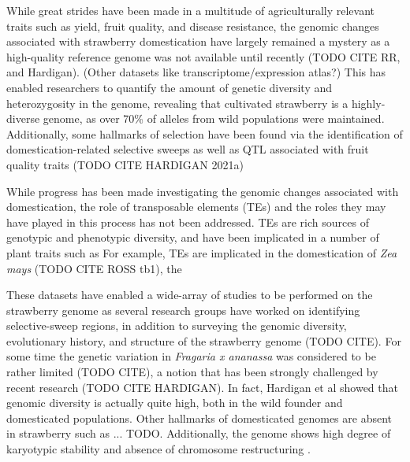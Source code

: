 \documentclass[fleqn,10pt]{olplainarticle}
\begin{document}
While great strides have been made in a multitude of agriculturally relevant traits such as yield, fruit quality, and disease resistance, the genomic changes associated with strawberry domestication have largely remained a mystery as a high-quality reference genome was not available until recently \cite{Edger2019} (TODO CITE RR, and Hardigan).
(Other datasets like transcriptome/expression atlas?)
This has enabled researchers to quantify the amount of genetic diversity and heterozygosity in the genome, revealing that cultivated strawberry is a highly-diverse genome, as over 70\% of alleles from wild populations were maintained.
Additionally, some hallmarks of selection have been found via the identification of domestication-related selective sweeps as well as QTL associated with fruit quality traits (TODO CITE HARDIGAN 2021a)

While progress has been made investigating the genomic changes associated with domestication, the role of transposable elements (TEs) and the roles they may have played in this process has not been addressed.
TEs are rich sources of genotypic and phenotypic diversity, and have been implicated in a number of plant traits such as 
For example, TEs are implicated in the domestication of \textit{Zea mays} (TODO CITE ROSS tb1), the 


These datasets have enabled a wide-array of studies to be performed on the strawberry genome as several research groups have worked on identifying selective-sweep regions, in addition to surveying the genomic diversity, evolutionary history, and structure of the strawberry genome (TODO CITE).
For some time the genetic variation in \textit{Fragaria x ananassa} was considered to be rather limited (TODO CITE), a notion that has been strongly challenged by recent research (TODO CITE HARDIGAN).
In fact, Hardigan et al showed that genomic diversity is actually quite high, both in the wild founder and domesticated populations.
Other hallmarks of domesticated genomes are absent in strawberry such as ... TODO.
Additionally, the genome shows high degree of karyotypic stability and absence of chromosome restructuring \cite{Hardigan2020, Hardigan2021}.
\end{document}
